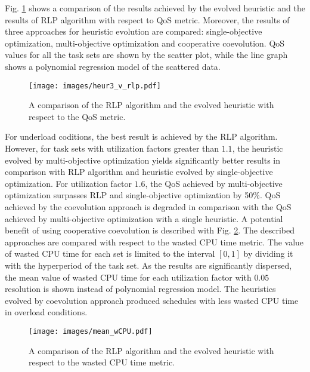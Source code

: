Fig. \ref{heur_v_rlp} shows a comparison of the results achieved by the evolved heuristic and the results of RLP algorithm with respect to QoS metric.
Moreover, the results of three approaches for heuristic evolution are compared:
single-objective optimization, multi-objective optimization and cooperative coevolution.
QoS values for all the task sets are shown by the scatter plot, while the line graph shows a polynomial regression model of the scattered data.
\begin{figure}[ht]
    \centering
    \texttt{[image: images/heur3\_v\_rlp.pdf]}
    \caption{A comparison of the RLP algorithm and the evolved heuristic with respect to the QoS metric.}
    \label{heur_v_rlp}
\end{figure}
For underload coditions, the best result is achieved by the RLP algorithm.
However, for task sets with utilization factors greater than $1.1$, the heuristic evolved by multi-objective optimization yields significantly better results in comparison with RLP algorithm and heuristic evolved by single-objective optimization.
For utilization factor $1.6$, the QoS achieved by multi-objective optimization surpasses RLP and single-objective optimization by 50\%.
QoS achieved by the coevolution approach is degraded in comparison with the QoS achieved by multi-objective optimization with a single heuristic.
A potential benefit of using cooperative coevolution is described with Fig. \ref{heur_v_rlp_wCPU}.
The described approaches are compared with respect to the wasted CPU time metric.
The value of wasted CPU time for each set is limited to the interval $[0, 1]$ by dividing it with the hyperperiod of the task set.
As the results are significantly dispersed, the mean value of wasted CPU time for each utilization factor with $0.05$ resolution is shown instead of polynomial regression model.
The heuristics evolved by coevolution approach produced schedules with less wasted CPU time in overload conditions.
\begin{figure}[ht]
    \centering
    \texttt{[image: images/mean\_wCPU.pdf]}
    \caption{A comparison of the RLP algorithm and the evolved heuristic with respect to the wasted CPU time metric.}
    \label{heur_v_rlp_wCPU}
\end{figure}

